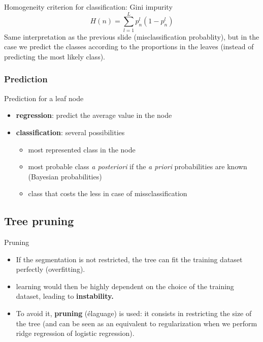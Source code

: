 \documentclass[usenames,dvipsnames]{beamer}
\begin{document}
\begin{frame}{Homogeneity criterion for classification: Gini impurity}
    \begin{equation}
	H(n) = \sum^{L}_{l=1} p_n^l(1-p_n^l)
    \end{equation}
    Same interpretation as the previous slide (misclassification probablity), but in the case we predict the classes according to the proportions in the leaves (instead of predicting the most likely class).
\end{frame}

\subsubsection{Prediction}%
\label{ssub:prediction}

\begin{frame}{Prediction for a leaf node}
    \begin{itemize}
        \item \textbf{{regression}}: predict the average value in the node
	\item \textbf{{classification}}: several possibilities
	    \begin{itemize}
	        \item most represented class in the node
		\item most probable class \textit{{a posteriori}} if the \textit{{a priori}} probabilities are known (Bayesian probabilities) 
		\item class that costs the less in case of missclassification
	    \end{itemize}
    \end{itemize}
\end{frame}


\subsection{Tree pruning}%
\label{sub:pruning}

\begin{frame}{Pruning}
    \begin{itemize}
	\item If the segmentation is not restricted, the tree can fit the training dataset perfectly (overfitting).
        \item learning would then be highly dependent on the choice of the training dataset, leading to \textbf{{instability.}} 
	\item To avoid it, \textbf{{pruning}} (élaguage) is used: it consists in restricting the size of the tree (and can be seen as an equivalent to regularization when we perform ridge regression of logistic regression). 
    \end{itemize}
\end{frame}
\end{document}
